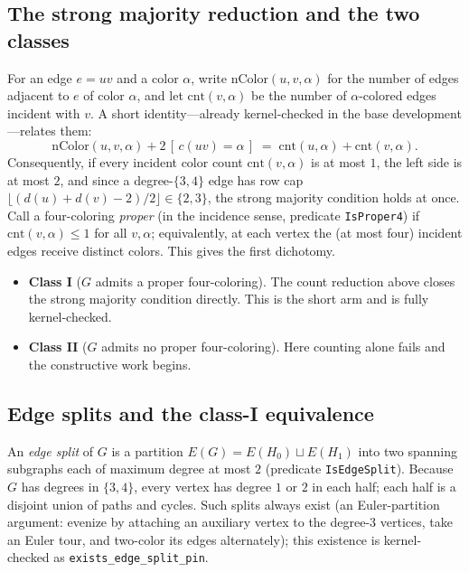 \documentclass[11pt]{article}
\theoremstyle{definition}
\theoremstyle{remark}
\providecommand{\tightlist}{\setlength{\itemsep}{0pt}\setlength{\parskip}{0pt}}
\begin{document}
\subsection{The strong majority reduction and the two classes}\label{21-two-classes}

For an edge $e = uv$ and a color $\alpha$, write $\mathrm{nColor}(u,v,\alpha)$ for the number of edges adjacent to $e$ of color $\alpha$, and let $\mathrm{cnt}(v,\alpha)$ be the number of $\alpha$-colored edges incident with $v$. A short identity---already kernel-checked in the base development---relates them:
\[
\mathrm{nColor}(u,v,\alpha) + 2\,[\,c(uv)=\alpha\,] \;=\; \mathrm{cnt}(u,\alpha) + \mathrm{cnt}(v,\alpha).
\]
Consequently, if every incident color count $\mathrm{cnt}(v,\alpha)$ is at most $1$, the left side is at most $2$, and since a degree-$\{3,4\}$ edge has row cap $\lfloor (d(u)+d(v)-2)/2 \rfloor \in \{2,3\}$, the strong majority condition holds at once. Call a four-coloring \emph{proper} (in the incidence sense, predicate \texttt{IsProper4}) if $\mathrm{cnt}(v,\alpha) \le 1$ for all $v,\alpha$; equivalently, at each vertex the (at most four) incident edges receive distinct colors. This gives the first dichotomy.

\begin{itemize}
\tightlist
\item
  \textbf{Class I} ($G$ admits a proper four-coloring). The count reduction above closes the strong majority condition directly. This is the short arm and is fully kernel-checked.
\item
  \textbf{Class II} ($G$ admits no proper four-coloring). Here counting alone fails and the constructive work begins.
\end{itemize}

\subsection{Edge splits and the class-I equivalence}\label{22-splits}

An \emph{edge split} of $G$ is a partition $E(G) = E(H_0) \sqcup E(H_1)$ into two spanning subgraphs each of maximum degree at most $2$ (predicate \texttt{IsEdgeSplit}). Because $G$ has degrees in $\{3,4\}$, every vertex has degree $1$ or $2$ in each half; each half is a disjoint union of paths and cycles. Such splits always exist (an Euler-partition argument: evenize by attaching an auxiliary vertex to the degree-3 vertices, take an Euler tour, and two-color its edges alternately); this existence is kernel-checked as \texttt{exists\_edge\_split\_pin}.
\end{document}
